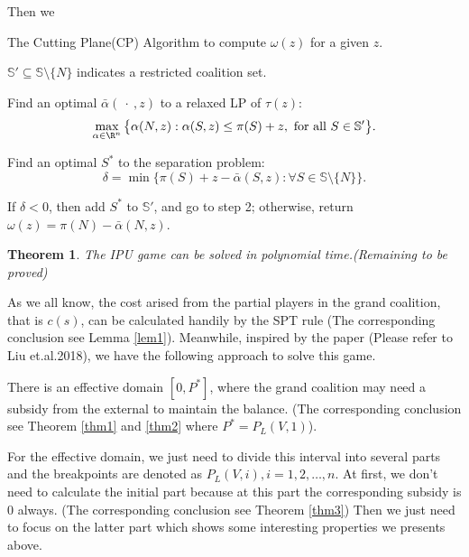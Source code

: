 \documentclass[UTF8]{article}
\newtheorem{thm}{\hspace{2em}Theorem}
\begin{document}
Then we

\begin{algorithm}[h]\label{algoCP}
\caption{The Cutting Plane(CP) Algorithm to compute $\omega(z)$ for a given $z$.}
\begin{algorithmic}[1]

\begin{description}
  \justifying
  \item[Step 1.] $\mathbb{S}'\subseteq \mathbb{S}\setminus \{N\}$ indicates a restricted coalition set.
  \item[Step 2.] Find an optimal $\bar{\alpha}(\ \cdot \ ,z)$ to a relaxed LP of $\tau(z)$:
  \begin{equation*}
  \max_{\alpha\in \R^n} \big\{ \alpha(N,z): \alpha(S,z) \leq \pi(S)+z, \mbox{ for all } S \in \mathbb{S}'\big\}.
  \end{equation*}
  \vspace{-11pt}
  \item[Step 3.]
  Find an optimal $S^*$ to the separation problem:
  \begin{equation*}
  \delta = \min \big\{ \pi(S)+z-\bar{\alpha}(S,z): \forall S \in \mathbb{S} \setminus \{N\}\big\}.
  \end{equation*}
  \item[Step 4.]
  If $\delta<0$, then add $S^*$ to $\mathbb{S}'$, and go to step 2; otherwise, return $\omega(z)=\pi(N)-\bar{\alpha}(N,z)$.
\end{description}

\end{algorithmic}
\end{algorithm}

\begin{thm}\label{thm6}
The IPU game can be solved in polynomial time.(Remaining to be proved)
\end{thm}

As we all know, the cost arised from the partial players in the grand coalition, that is $c(s)$, can be calculated handily by the SPT rule (The corresponding conclusion see Lemma \ref{lem1}). Meanwhile, inspired by the paper (Please refer to Liu et.al.2018), we have the following approach to solve this game.

There is an effective domain $[0, P^*]$, where the grand coalition may need a subsidy from the external to maintain the balance.
(The corresponding conclusion see Theorem \ref{thm1} and \ref{thm2} where $P^* = P_L(V,1)$).

For the effective domain, we just need to divide this interval into several parts and the breakpoints are denoted as $P_L(V,i), i = 1,2,\ldots,n$.  At first, we don't need to calculate the initial part because at this part the corresponding subsidy is 0 always. (The corresponding conclusion see Theorem \ref{thm3}) Then we just need to focus on the latter part which shows some interesting properties we presents above.
\end{document}

